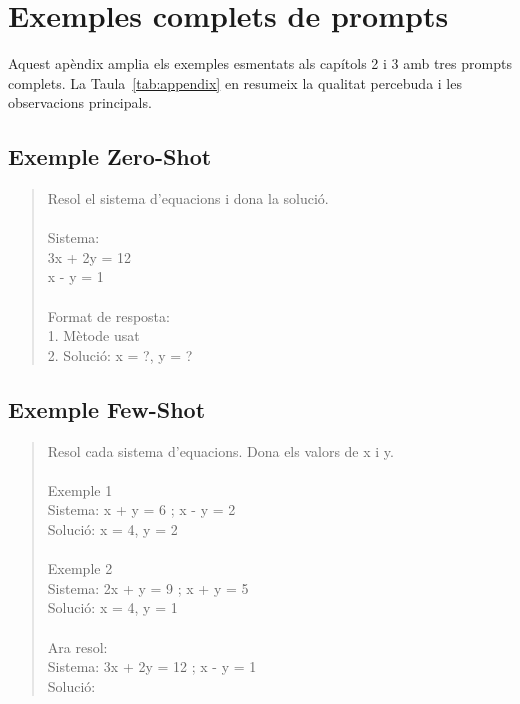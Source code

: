 \documentclass[12pt,a4paper]{report}
\begin{document}
\printbibliography[heading=bibintoc,title={Referències}]

\appendix
\chapter{Exemples complets de prompts}\label{app:exemples}
Aquest apèndix amplia els exemples esmentats als capítols 2 i 3 amb tres prompts complets. La Taula~\ref{tab:appendix} en resumeix la qualitat percebuda i les observacions principals.

\section{Exemple Zero-Shot}
\begin{quote}
\ttfamily\small
Resol el sistema d'equacions i dona la solució.\\
\\
Sistema:\\
\quad 3x + 2y = 12\\
\quad  x -  y =  1\\
\\
Format de resposta:\\
1. Mètode usat\\
2. Solució: x = ?, y = ?
\end{quote}

\section{Exemple Few-Shot}
\begin{quote}
\ttfamily\small
Resol cada sistema d'equacions. Dona els valors de x i y.\\
\\
Exemple 1\\
Sistema: x + y = 6 ;  x - y = 2\\
Solució: x = 4, y = 2\\
\\
Exemple 2\\
Sistema: 2x + y = 9 ; x + y = 5\\
Solució: x = 4, y = 1\\
\\
Ara resol:\\
Sistema: 3x + 2y = 12 ; x - y = 1\\
Solució:
\end{quote}
\end{document}
